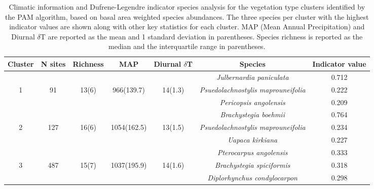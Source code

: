 \begin{table}[H]
\centering
\begin{tabular}{ccccccc}
  \hline
Cluster & N sites & Richness & MAP & Diurnal $\delta$T & Species & Indicator value \\ 
  \hline
 &  &  &  &  & \textit{Julbernardia paniculata} & 0.712 \\ 
  1 & 91 & 13(6) & 966(139.7) & 14(1.3) & \textit{Psuedolachnostylis maprouneifolia} & 0.222 \\ 
   &  &  &  &  & \textit{Pericopsis angolensis} & 0.209 \\ 
   \hline
 &  &  &  &  & \textit{Brachystegia boehmii} & 0.764 \\ 
  2 & 127 & 16(6) & 1054(162.5) & 13(1.5) & \textit{Psuedolachnostylis maprouneifolia} & 0.234 \\ 
   &  &  &  &  & \textit{Uapaca kirkiana} & 0.227 \\ 
   \hline
 &  &  &  &  & \textit{Pterocarpus angolensis} & 0.333 \\ 
  3 & 487 & 15(7) & 1037(195.9) & 14(1.6) & \textit{Brachystegia spiciformis} & 0.318 \\ 
   &  &  &  &  & \textit{Diplorhynchus condylocarpon} & 0.298 \\ 
  \end{tabular}
\caption{Climatic information and Dufrene-Legendre indicator species analysis for the vegetation type clusters identified by the PAM algorithm, based on basal area weighted species abundances. The three species per cluster with the highest indicator values are shown along with other key statistics for each cluster. MAP (Mean Annual Precipitation) and Diurnal $\delta$T are reported as the mean and 1 standard deviation in parentheses. Species richness is reported as the median and the interquartile range in parentheses.} 
\label{clust_summ}
\end{table}

